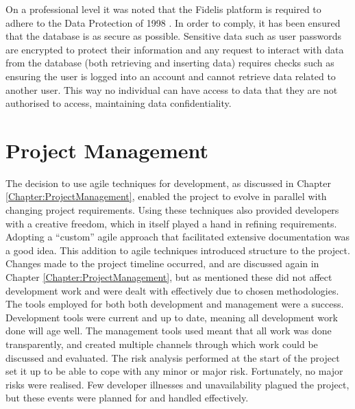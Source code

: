 On a professional level it was noted that the Fidelis platform is required to adhere to the Data Protection of 1998 \cite{DPA}. In order to comply, it has been ensured that the database is as secure as possible. Sensitive data such as user passwords are encrypted to protect their information and any request to interact with data from the database (both retrieving and inserting data) requires checks such as ensuring the user is logged into an account and cannot retrieve data related to another user. This way no individual can have access to data that they are not authorised to access, maintaining data confidentiality.

\section{Project Management}
The decision to use agile techniques for development, as discussed in Chapter \ref{Chapter:ProjectManagement}, enabled the project to evolve in parallel with changing project requirements. Using these techniques also provided developers with a creative freedom, which in itself played a hand in refining requirements. Adopting a ``custom'' agile approach that facilitated extensive documentation was a good idea. This addition to agile techniques introduced structure to the project. Changes made to the project timeline occurred, and are discussed again in Chapter \ref{Chapter:ProjectManagement}, but as mentioned these did not affect development work and were dealt with effectively due to chosen methodologies. The tools employed for both both development and management were a success. Development tools were current and up to date, meaning all development work done will age well. The management tools used meant that all work was done transparently, and created multiple channels through which work could be discussed and evaluated. The risk analysis performed at the start of the project set it up to be able to cope with any minor or major risk. Fortunately, no major risks were realised. Few developer illnesses and unavailability plagued the project, but these events were planned for and handled effectively.